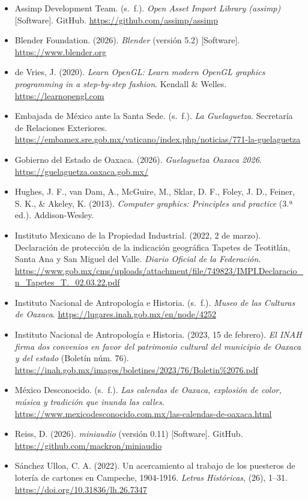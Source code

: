 \documentclass[11pt,a4paper]{article}
\begin{document}
\begin{itemize}[label={}, leftmargin=1.27cm, itemindent=-1.27cm]
  \item Assimp Development Team. (s.~f.). \textit{Open Asset Import Library (assimp)} [Software]. GitHub. \url{https://github.com/assimp/assimp}
  \item Blender Foundation. (2026). \textit{Blender} (versión 5.2) [Software]. \url{https://www.blender.org}
  \item de Vries, J. (2020). \textit{Learn OpenGL: Learn modern OpenGL graphics programming in a step-by-step fashion}. Kendall \& Welles. \url{https://learnopengl.com}
  \item Embajada de México ante la Santa Sede. (s.~f.). \textit{La Guelaguetza}. Secretaría de Relaciones Exteriores. \url{https://embamex.sre.gob.mx/vaticano/index.php/noticias/771-la-guelaguetza}
  \item Gobierno del Estado de Oaxaca. (2026). \textit{Guelaguetza Oaxaca 2026}. \url{https://guelaguetza.oaxaca.gob.mx/}
  \item Hughes, J. F., van Dam, A., McGuire, M., Sklar, D. F., Foley, J. D., Feiner, S. K., \& Akeley, K. (2013). \textit{Computer graphics: Principles and practice} (3.ª ed.). Addison-Wesley.
  \item Instituto Mexicano de la Propiedad Industrial. (2022, 2 de marzo). Declaración de protección de la indicación geográfica Tapetes de Teotitlán, Santa Ana y San Miguel del Valle. \textit{Diario Oficial de la Federación}. \url{https://www.gob.mx/cms/uploads/attachment/file/749823/IMPI.Declaracio_n_Tapetes_T._02.03.22.pdf}
  \item Instituto Nacional de Antropología e Historia. (s.~f.). \textit{Museo de las Culturas de Oaxaca}. \url{https://lugares.inah.gob.mx/en/node/4252}
  \item Instituto Nacional de Antropología e Historia. (2023, 15 de febrero). \textit{El INAH firma dos convenios en favor del patrimonio cultural del municipio de Oaxaca y del estado} (Boletín núm. 76). \url{https://inah.gob.mx/images/boletines/2023/76/Boletin%2076.pdf}
  \item México Desconocido. (s.~f.). \textit{Las calendas de Oaxaca, explosión de color, música y tradición que inunda las calles}. \url{https://www.mexicodesconocido.com.mx/las-calendas-de-oaxaca.html}
  \item Reiss, D. (2026). \textit{miniaudio} (versión 0.11) [Software]. GitHub. \url{https://github.com/mackron/miniaudio}
  \item Sánchez Ulloa, C. A. (2022). Un acercamiento al trabajo de los puesteros de lotería de cartones en Campeche, 1904-1916. \textit{Letras Históricas}, (26), 1--31. \url{https://doi.org/10.31836/lh.26.7347}

\end{itemize}
\end{document}
